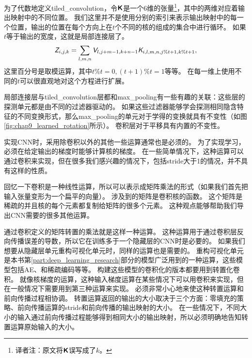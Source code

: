  
为了代数地定义\gls{tiled_convolution}，令$\textsf{\textbf{K}}$是一个6维的张量\footnote{译者注：原文将$\textsf{\textbf{K}}$误写成了$k$。}，其中的两维对应着输出映射中的不同位置。%
我们这里并不是使用分别的索引来表示输出映射中的每一个位置，输出的位置在每个方向上在$t$个不同的核的组成的集合中进行循环。
如果$t$等于输出的宽度，这就是局部连接层了。
\begin{equation}
\textit{\textsf{Z}}_{i, j, k} = \sum_{l, m, n} \textit{\textsf{V}}_{l, j+m-1, k+n-1} \textit{\textsf{K}}_{i, l, m, n, j\% t +1, k\% t+1},
\end{equation}
这里百分号是取模运算，其中$t\% t =0, (t+1)\% t = 1$等等。
在每一维上使用不同的$t$可以很直观地对这个方程进行扩展。%
 
  
 
局部连接层与\gls{tiled_convolution}层都和\gls{max_pooling}有一些有趣的关联：这些层的探测单元都是由不同的过滤器驱动的。
如果这些过滤器能够学会探测相同隐含特征的不同变换形式，那么\gls{max_pooling}的单元对于学得的变换就具有不变性（如图\ref{fig:chap9_learned_rotation}所示）。
卷积层对于平移具有内置的不变性。
 
 
实现\gls{CNN}时，采用除卷积以外的其他一些运算通常也是必须的。
为了实现学习，必须在给定输出的梯度时能够计算核的梯度。
在一些简单情况下，这种运算可以通过卷积来实现，但在很多我们感兴趣的情况下，包括\gls{stride}大于1的情况，并不具有这样的性质。

回忆一下卷积是一种线性运算，所以可以表示成矩阵乘法的形式（如果我们首先把输入张量变形为一个扁平的向量）。
涉及到的矩阵是卷积核的函数。
这个矩阵是稀疏的并且核的每个元素都复制给矩阵的很多个元素。
这种观点能够帮助我们导出\gls{CNN}需要的很多其他运算。

通过卷积定义的矩阵转置的乘法就是这样一种运算。
这种运算用于通过卷积层反向传播误差的导数，所以它在训练多于一个隐藏层的\gls{CNN}时是必要的。
如果我们想要从隐藏层单元重构可视化单元时，同样的运算也是需要的\citep{Simard92-short}。
重构可视化单元是本书第\ref{part:deep_learning_research}部分的模型广泛用到的一种运算，这些模型包括\gls{AE}、和稀疏编码等等。
构建这些模型的卷积化的版本都要用到转置化卷积。
就像核梯度的运算，这种输入梯度运算在某些情况下可以用卷积来实现，但在一般情况下需要用到第三种运算来实现。%
必须非常小心地来使这种转置运算和前向传播过程相协调。
转置运算返回的输出的大小取决于三个方面：零填充的策略、前向传播运算的\gls{stride}和前向传播的输出映射的大小。
在一些情况下，不同大小的输入通过前向传播过程能够得到相同大小的输出映射，所以必须明确地告知转置运算原始输入的大小。


